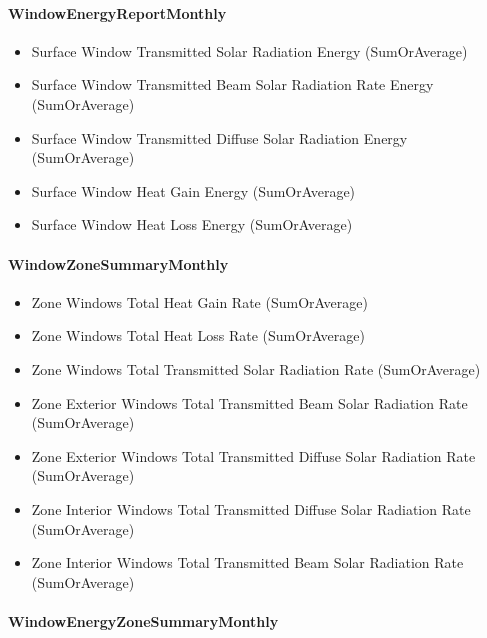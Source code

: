 \paragraph{WindowEnergyReportMonthly}\label{windowenergyreportmonthly}

\begin{itemize}
\item
  Surface Window Transmitted Solar Radiation Energy (SumOrAverage)
\item
  Surface Window Transmitted Beam Solar Radiation Rate Energy (SumOrAverage)
\item
  Surface Window Transmitted Diffuse Solar Radiation Energy (SumOrAverage)
\item
  Surface Window Heat Gain Energy (SumOrAverage)
\item
  Surface Window Heat Loss Energy (SumOrAverage)
\end{itemize}

\paragraph{WindowZoneSummaryMonthly}\label{windowzonesummarymonthly}

\begin{itemize}
\item
  Zone Windows Total Heat Gain Rate (SumOrAverage)
\item
  Zone Windows Total Heat Loss Rate (SumOrAverage)
\item
  Zone Windows Total Transmitted Solar Radiation Rate (SumOrAverage)
\item
  Zone Exterior Windows Total Transmitted Beam Solar Radiation Rate (SumOrAverage)
\item
  Zone Exterior Windows Total Transmitted Diffuse Solar Radiation Rate (SumOrAverage)
\item
  Zone Interior Windows Total Transmitted Diffuse Solar Radiation Rate (SumOrAverage)
\item
  Zone Interior Windows Total Transmitted Beam Solar Radiation Rate (SumOrAverage)
\end{itemize}

\paragraph{WindowEnergyZoneSummaryMonthly}\label{windowenergyzonesummarymonthly}

